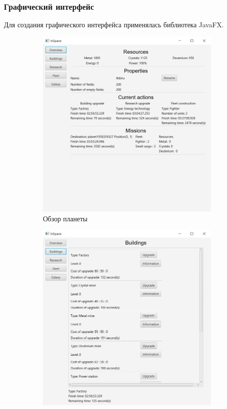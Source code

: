 \subsubsection{Графический интерфейс}
Для создания графического интерфейса применялась библиотека JavaFX.

\begin{figure}[H]
\centering
\begin{subfigure}[b]{0.4\textwidth} 
\includegraphics[width=1\textwidth]{../screenshots/1.png}
\caption{Обзор планеты}
\end{subfigure}
\begin{subfigure}[b]{0.4\textwidth} 
\includegraphics[width=1\textwidth]{../screenshots/2.png}

\end{subfigure}
\end{figure}
